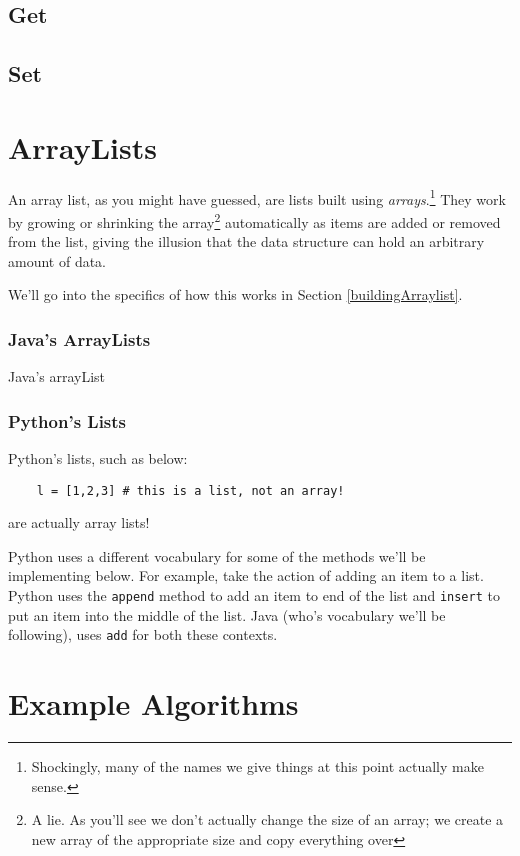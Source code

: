\subsection{Get}
\subsection{Set}

\section{ArrayLists}
An array list, as you might have guessed, are lists built using \textit{arrays}.\footnote{Shockingly, many of the names we give things at this point actually make sense.}
They work by growing or shrinking the array\footnote{A lie.  As you'll see we don't actually change the size of an array;  we create a new array of the appropriate size and copy everything over} automatically as items are added or removed from the list, giving the illusion that the data structure can hold an arbitrary amount of data.

We'll go into the specifics of how this works in Section \ref{buildingArraylist}.


\subsubsection{Java's ArrayLists}
Java's arrayList
\subsubsection{Python's Lists}
Python's lists, such as below:
\begin{verbatim}
	l = [1,2,3] # this is a list, not an array!	
\end{verbatim}
are actually array lists! %

Python uses a different vocabulary for some of the methods we'll be implementing below.  
For example, take the action of adding an item to a list.
Python uses the \texttt{append} method to add an item to end of the list and \texttt{insert} to put an item into the middle of the list.
Java (who's vocabulary we'll be following), uses \texttt{add} for both these contexts. 









\section{Example Algorithms}


